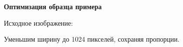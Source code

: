 \textbf{Оптимизация образца примера}
\bigskip

Исходное изображение:

\noindent
\begin{minipage}{\linewidth}
\end{minipage}
\bigskip

Уменьшим ширину до 1024 пикселей, сохраняя пропорции.

